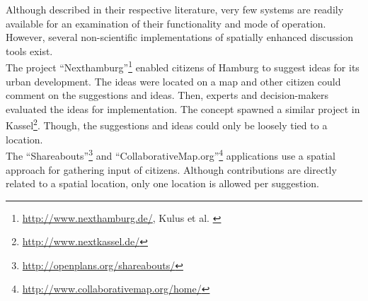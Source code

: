Although described in their respective literature, very few systems are readily available for an examination of their functionality and mode of operation. However, several non-scientific implementations of spatially enhanced discussion tools exist.\\
The project ``Nexthamburg''\footnote{\url{http://www.nexthamburg.de/}, Kulus et al. \cite{Kulus_nexthamburg}} enabled citizens of Hamburg to suggest ideas for its urban development. The ideas were located on a map and other citizen could comment on the suggestions and ideas. Then, experts and decision-makers evaluated the ideas for implementation. The concept spawned a similar project in Kassel\footnote{\url{http://www.nextkassel.de/}}. Though, the suggestions and ideas could only be loosely tied to a location.\\
The ``Shareabouts''\footnote{\url{http://openplans.org/shareabouts/}} and ``CollaborativeMap.org''\footnote{\url{http://www.collaborativemap.org/home/}} applications use a spatial approach for gathering input of citizens. Although contributions are directly related to a spatial location, only one location is allowed per suggestion.

